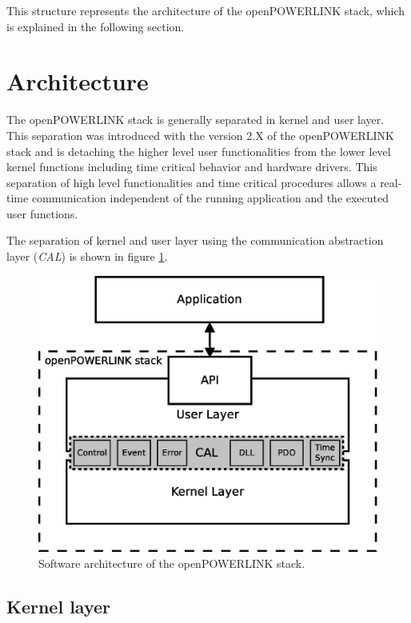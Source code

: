 This structure represents the architecture of the openPOWERLINK stack, which is explained in the following section.

\section{Architecture}
\label{sec:oplk_architecture}

The openPOWERLINK stack is generally separated in kernel and user layer.
This separation was introduced with the version 2.X of the openPOWERLINK stack and is detaching the higher level user functionalities from the lower level kernel functions including time critical behavior and hardware drivers.
This separation of high level functionalities and time critical procedures allows a real-time communication independent of the running application and the executed user functions.

The separation of kernel and user layer using the communication abstraction layer (\emph{CAL}) is shown in figure \ref{fig:openpowerlink_arch}.

\begin{figure}
\centering
\includegraphics[width=0.9\linewidth]{images/openpowerlink_arch}
\caption{Software architecture of the openPOWERLINK stack.}
\label{fig:openpowerlink_arch}
\end{figure}


\subsection{Kernel layer}
\label{sec:oplk_architecture_kernel}

